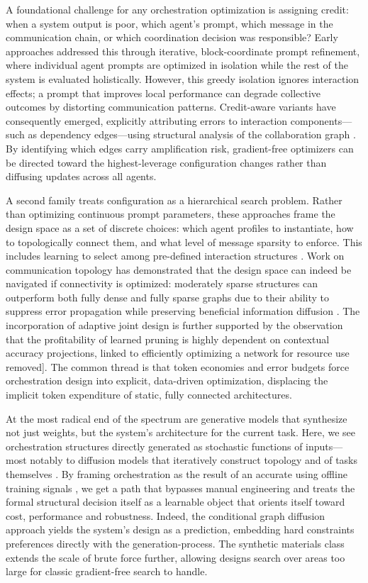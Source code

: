 \documentclass[11pt,a4paper]{article}
\begin{document}
A foundational challenge for any orchestration optimization is assigning credit: when a system output is poor, which agent's prompt, which message in the communication chain, or which coordination decision was responsible? Early approaches addressed this through iterative, block-coordinate prompt refinement, where individual agent prompts are optimized in isolation while the rest of the system is evaluated holistically. However, this greedy isolation ignores interaction effects; a prompt that improves local performance can degrade collective outcomes by distorting communication patterns. Credit-aware variants have consequently emerged, explicitly attributing errors to interaction components---such as dependency edges---using structural analysis of the collaboration graph \cite{arxiv:2603.04474v2}. By identifying which edges carry amplification risk, gradient-free optimizers can be directed toward the highest-leverage configuration changes rather than diffusing updates across all agents.

A second family treats configuration as a hierarchical search problem. Rather than optimizing continuous prompt parameters, these approaches frame the design space as a set of discrete choices: which agent profiles to instantiate, how to topologically connect them, and what level of message sparsity to enforce. This includes learning to select among pre-defined interaction structures \cite{arxiv:2501.06322v1}. Work on communication topology has demonstrated that the design space can indeed be navigated if connectivity is optimized: moderately sparse structures can outperform both fully dense and fully sparse graphs due to their ability to suppress error propagation while preserving beneficial information diffusion \cite{arxiv:2505.23352v1}. The incorporation of adaptive joint design is further supported by the observation that the profitability of learned pruning is highly dependent on contextual accuracy projections, linked to efficiently optimizing a network for resource use \cite{arxiv:2506.01839v3} removed]. The common thread is that token economies and error budgets force orchestration design into explicit, data-driven optimization, displacing the implicit token expenditure of static, fully connected architectures.

At the most radical end of the spectrum are generative models that synthesize not just weights, but the system's architecture for the current task. Here, we see orchestration structures directly generated as stochastic functions of inputs---most notably to diffusion models that iteratively construct topology and of tasks themselves \cite{arxiv:2510.07799v2}. By framing orchestration as the result of an accurate using offline training signals \cite{arxiv:2510.07799v2}, we get a path that bypasses manual engineering and treats the formal structural decision itself as a learnable object that orients itself toward cost, performance and robustness. Indeed, the conditional graph diffusion approach yields the system's design as a prediction, embedding hard constraints preferences directly with the generation-process. The synthetic materials class extends the scale of brute force further, allowing designs search over areas too large for classic gradient-free search to handle.
\end{document}
